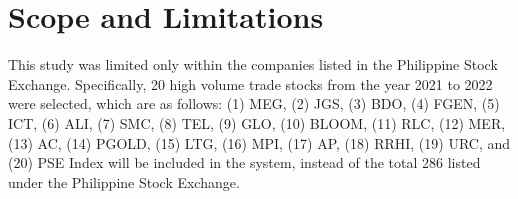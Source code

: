 \section{Scope and Limitations}
\label{sec:scope}
This study was limited only within the companies listed in the 
Philippine Stock Exchange. Specifically, 20 high volume trade stocks from the year 2021 to 2022 
were selected, which are as follows: (1) MEG, (2) JGS, (3) BDO, (4) FGEN, 
(5) ICT, (6) ALI, (7) SMC, (8) TEL, (9) GLO, (10) BLOOM, (11) RLC, (12) MER, 
(13) AC, (14) PGOLD, (15) LTG, (16) MPI, (17) AP, (18) RRHI, (19) URC, and 
(20) PSE Index will be included in the system, instead of the total 286 listed
under the Philippine Stock Exchange.